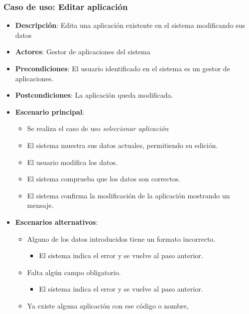 \documentclass[12pt,a4paperpaper,]{report}
\providecommand{\tightlist}{%
  \setlength{\itemsep}{0pt}\setlength{\parskip}{0pt}}
\begin{document}
\subsubsection{Caso de uso: Editar
aplicación}\label{caso-de-uso-editar-aplicaciuxf3n}

\begin{itemize}
\tightlist
\item
  \textbf{Descripción}: Edita una aplicación existente en el sistema
  modificando sus datos
\item
  \textbf{Actores}: Gestor de aplicaciones del sistema
\item
  \textbf{Precondiciones}: El usuario identificado en el sistema es un
  gestor de aplicaciones.
\item
  \textbf{Postcondiciones}: La aplicación queda modificada.
\item
  \textbf{Escenario principal}:

  \begin{itemize}
  \tightlist
  \item
    Se realiza el caso de uso \emph{seleccionar aplicación}
  \item
    El sistema muestra sus datos actuales, permitiendo su edición.
  \item
    El usuario modifica los datos.
  \item
    El sistema comprueba que los datos son correctos.
  \item
    El sistema confirma la modificación de la aplicación mostrando un
    mensaje.
  \end{itemize}
\item
  \textbf{Escenarios alternativos}:

  \begin{itemize}
  \tightlist
  \item
    Alguno de los datos introducidos tiene un formato incorrecto.

    \begin{itemize}
    \tightlist
    \item
      El sistema indica el error y se vuelve al paso anterior.
    \end{itemize}
  \item
    Falta algún campo obligatorio.

    \begin{itemize}
    \tightlist
    \item
      El sistema indica el error y se vuelve al paso anterior.
    \end{itemize}
  \item
    Ya existe alguna aplicación con ese código o nombre,


\end{itemize}
\end{itemize}
\end{document}

